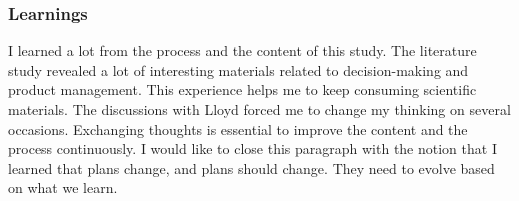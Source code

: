\subsubsection{Learnings}
I learned a lot from the process and the content of this study. The literature study revealed a lot of interesting materials related to decision-making and product management. This experience helps me to keep consuming scientific materials. The discussions with Lloyd forced me to change my thinking on several occasions. Exchanging thoughts is essential to improve the content and the process continuously. I would like to close this paragraph with the notion that I learned that plans change, and plans should change. They need to evolve based on what we learn.
